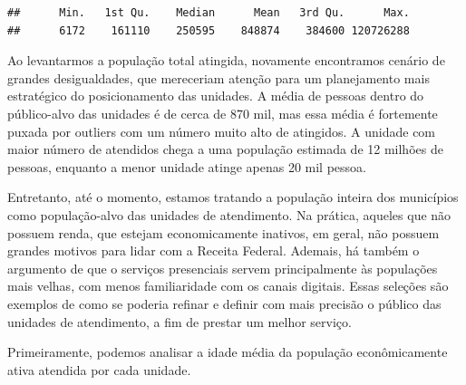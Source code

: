 \documentclass[]{article}
\newenvironment{Shaded}{\begin{snugshade}}{\end{snugshade}}
\newcommand{\KeywordTok}[1]{\textcolor[rgb]{0.13,0.29,0.53}{\textbf{#1}}}
\newcommand{\NormalTok}[1]{#1}
\newcommand{\OperatorTok}[1]{\textcolor[rgb]{0.81,0.36,0.00}{\textbf{#1}}}
\begin{document}
\begin{Shaded}
\end{Shaded}

\begin{verbatim}
##      Min.   1st Qu.    Median      Mean   3rd Qu.      Max. 
##      6172    161110    250595    848874    384600 120726288
\end{verbatim}

Ao levantarmos a população total atingida, novamente encontramos cenário
de grandes desigualdades, que mereceriam atenção para um planejamento
mais estratégico do posicionamento das unidades. A média de pessoas
dentro do público-alvo das unidades é de cerca de 870 mil, mas essa
média é fortemente puxada por outliers com um número muito alto de
atingidos. A unidade com maior número de atendidos chega a uma população
estimada de 12 milhões de pessoas, enquanto a menor unidade atinge
apenas 20 mil pessoa.

Entretanto, até o momento, estamos tratando a população inteira dos
municípios como população-alvo das unidades de atendimento. Na prática,
aqueles que não possuem renda, que estejam economicamente inativos, em
geral, não possuem grandes motivos para lidar com a Receita Federal.
Ademais, há também o argumento de que o serviços presenciais servem
principalmente às populações mais velhas, com menos familiaridade com os
canais digitais. Essas seleções são exemplos de como se poderia refinar
e definir com mais precisão o público das unidades de atendimento, a fim
de prestar um melhor serviço.

Primeiramente, podemos analisar a idade média da população
econômicamente ativa atendida por cada unidade.
\end{document}
